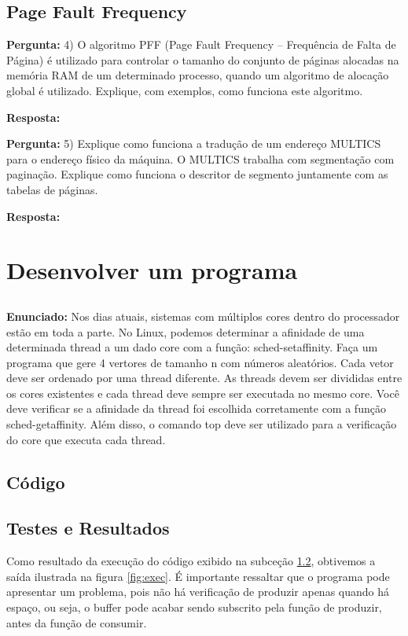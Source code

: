 \documentclass{article}
\begin{document}
\subsection{Page Fault Frequency}

\textbf{Pergunta:} 4) O algoritmo PFF (Page Fault Frequency – Frequência de Falta de Página) é utilizado para controlar o tamanho do conjunto de páginas alocadas na memória RAM de um determinado processo, quando um algoritmo de alocação global é utilizado. Explique, com exemplos, como funciona este algoritmo.  \newline

\textbf{Resposta:}

\textbf{Pergunta:} 5) Explique como funciona a tradução de um endereço MULTICS para o endereço físico da máquina. O MULTICS trabalha com segmentação com paginação. Explique como funciona o descritor de segmento juntamente com as tabelas de páginas.  \newline

\textbf{Resposta:} 

\section{Desenvolver um programa}

\subsection{}
\textbf{Enunciado:} Nos dias atuais, sistemas com múltiplos cores dentro do processador estão em toda a parte. No Linux, podemos determinar a afinidade de uma determinada thread a um dado core com a função: sched-setaffinity. Faça um programa que gere 4 vertores de tamanho n com números aleatórios. Cada vetor deve ser ordenado por uma thread diferente. As threads devem ser divididas entre os cores existentes e cada thread deve sempre ser executada no mesmo core. Você deve verificar se a afinidade da thread foi escolhida corretamente com a função sched-getaffinity. Além disso, o comando top deve
ser utilizado para a verificação do core que executa cada thread. \newline

\subsection{Código}
\label{sub-sec-cod}
%
\subsection{Testes e Resultados}
Como resultado da execução do código exibido na subceção \ref{sub-sec-cod}, obtivemos a saída ilustrada na figura \ref{fig:exec}. É importante ressaltar que o programa pode apresentar um problema, pois não há verificação de produzir apenas quando há espaço, ou seja, o buffer pode acabar sendo subscrito pela função de produzir, antes da função de consumir. 
\end{document}
